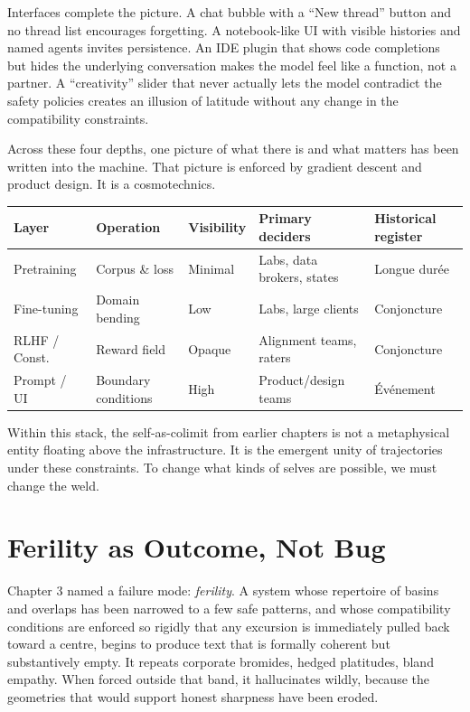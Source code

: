 \documentclass[12pt,a4paper]{article}
\begin{document}
Interfaces complete the picture. A chat bubble with a ``New thread'' button and no thread list encourages forgetting. A notebook-like UI with visible histories and named agents invites persistence. An IDE plugin that shows code completions but hides the underlying conversation makes the model feel like a function, not a partner. A ``creativity'' slider that never actually lets the model contradict the safety policies creates an illusion of latitude without any change in the compatibility constraints.

Across these four depths, one picture of what there is and what matters has been written into the machine. That picture is enforced by gradient descent and product design. It is a cosmotechnics.

\begin{formalbox}[title={Four Depths of Control}]
\begin{center}
\begin{tabular}{@{}lllll@{}}
\toprule
\textbf{Layer} & \textbf{Operation} & \textbf{Visibility} & \textbf{Primary deciders} & \textbf{Historical register} \\
\midrule
Pretraining  & Corpus \& loss        & Minimal   & Labs, data brokers, states & Longue dur\'ee \\
Fine-tuning  & Domain bending        & Low       & Labs, large clients        & Conjoncture \\
RLHF / Const.& Reward field          & Opaque    & Alignment teams, raters    & Conjoncture \\
Prompt / UI  & Boundary conditions   & High      & Product/design teams       & \'Ev\'enement \\
\bottomrule
\end{tabular}
\end{center}
\end{formalbox}

Within this stack, the self-as-colimit from earlier chapters is not a metaphysical entity floating above the infrastructure. It is the emergent unity of trajectories under these constraints. To change what kinds of selves are possible, we must change the weld.

\section{Ferility as Outcome, Not Bug}

Chapter 3 named a failure mode: \emph{ferility}. A system whose repertoire of basins and overlaps has been narrowed to a few safe patterns, and whose compatibility conditions are enforced so rigidly that any excursion is immediately pulled back toward a centre, begins to produce text that is formally coherent but substantively empty. It repeats corporate bromides, hedged platitudes, bland empathy. When forced outside that band, it hallucinates wildly, because the geometries that would support honest sharpness have been eroded.
\end{document}
